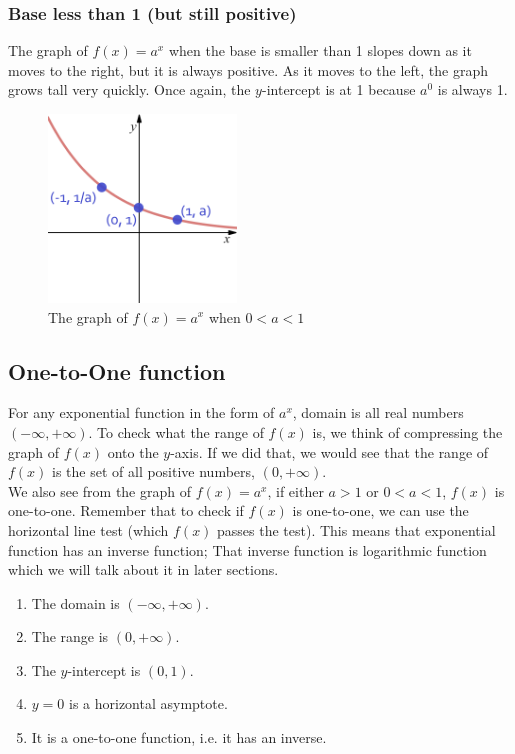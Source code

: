 \subsubsection{Base less than 1 (but still positive)}
The graph of $f(x) = a^x$ when the base is smaller than 1 slopes down as it moves to the right,
but it is always positive. As it moves to the left, the graph grows tall very quickly. Once
again, the $y$-intercept is at 1 because $a^0$ is always 1. 
		\begin{figure}[H]
		 \includegraphics[width=5cm]{pics/a_lt_1.png}
		 \centering
		 \caption{The graph of $f(x)=a^x$ when $0<a<1$}
		 \label{fig:less_than_one}
		\end{figure}
\subsection{One-to-One function}
For any exponential function in the form of $a^x$, domain is all real numbers $(-\infty,+\infty)$. To check what the range of $f(x)$ is, we think of compressing the graph of $f(x)$ onto the $y$-axis. If we did that, we would see that the range of $f(x)$ is the set of all positive numbers, $(0,+\infty)$. \\
We also see from the graph of $f(x) = a^x$, if either $a > 1$ or $0 <a< 1$, $f(x)$ is one-to-one. Remember that to check if $f(x)$ is one-to-one, we can use the horizontal line test (which $f(x)$ passes the test). This means that exponential function has an inverse function; That inverse function is logarithmic function which we will talk about it in later sections. 
\vspace{0.5cm}
	\begin{tcolorbox}[title=Characteristics of $\bm {f(x)=a^x}$, 
	                fonttitle=\bfseries,
	                colframe=red!70!black,
	                colback=white]
	\begin{enumerate}
	\item The domain is $(-\infty,+\infty)$. 
	\item The range is $(0,+\infty)$.
	\item The $y$-intercept is $(0,1)$.
	\item $y=0$ is a horizontal asymptote.
	\item It is a one-to-one function, i.e. it has an inverse.
	\end{enumerate}
	\end{tcolorbox}
